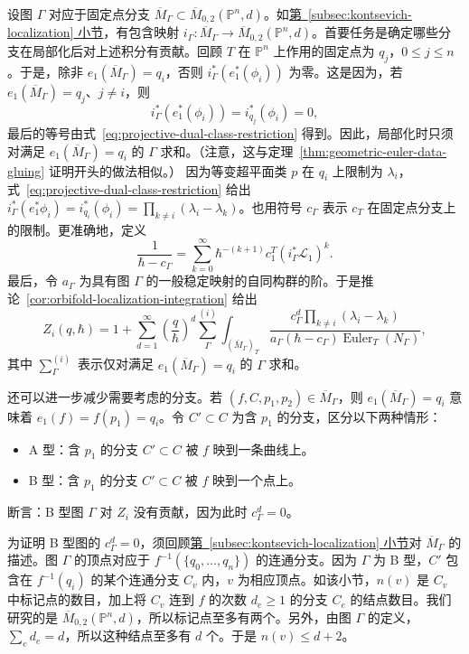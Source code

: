 设图 $\Gamma$ 对应于固定点分支 $\overline M_\Gamma\subset\overline M_{0,2}(\mathbb P^n,d)$。如\hyperref[subsec:kontsevich-localization]{第~\ref*{subsec:kontsevich-localization} 小节}，有包含映射 $i_\Gamma:\overline M_\Gamma\to\overline M_{0,2}(\mathbb P^n,d)$。首要任务是确定哪些分支在局部化后对上述积分有贡献。回顾 $T$ 在 $\mathbb P^n$ 上作用的固定点为 $q_j$，$0\le j\le n$。于是，除非 $e_1(\overline M_\Gamma)=q_i$，否则 $i_\Gamma^*(e_1^*(\phi_i))$ 为零。这是因为，若 $e_1(\overline M_\Gamma)=q_j$、$j\ne i$，则
\[
i_\Gamma^*(e_1^*(\phi_i))=i_{q_j}^*(\phi_i)=0,
\]
最后的等号由式~\eqref{eq:projective-dual-class-restriction} 得到。因此，局部化时只须对满足 $e_1(\overline M_\Gamma)=q_i$ 的 $\Gamma$ 求和。（注意，这与定理~\ref{thm:geometric-euler-data-gluing} 证明开头的做法相似。）
因为等变超平面类 $p$ 在 $q_i$ 上限制为 $\lambda_i$，式~\eqref{eq:projective-dual-class-restriction} 给出 $i_\Gamma^*(e_1^*\phi_i)=i_{q_i}^*(\phi_i)=\prod_{k\ne i}(\lambda_i-\lambda_k)$。也用符号 $c_\Gamma$ 表示 $c_T$ 在固定点分支上的限制。更准确地，定义
\[
\frac1{\hbar-c_\Gamma}=\sum_{k=0}^{\infty}\hbar^{-(k+1)}c_1^T(i_\Gamma^*\mathcal L_1)^k.
\]
最后，令 $a_\Gamma$ 为具有图 $\Gamma$ 的一般稳定映射的自同构群的阶。于是推论~\ref{cor:orbifold-localization-integration} 给出
\begin{equation}\label{eq:projective-space-j-localization}
Z_i(q,\hbar)=1+\sum_{d=1}^{\infty}\left(\frac q\hbar\right)^d\sum_\Gamma^{(i)}
\int_{(\overline M_\Gamma)_T}
\frac{c_\Gamma^d\prod_{k\ne i}(\lambda_i-\lambda_k)}{a_\Gamma(\hbar-c_\Gamma)\operatorname{Euler}_T(N_\Gamma)},
\end{equation}
其中 $\sum_\Gamma^{(i)}$ 表示仅对满足 $e_1(\overline M_\Gamma)=q_i$ 的 $\Gamma$ 求和。

还可以进一步减少需要考虑的分支。若 $(f,C,p_1,p_2)\in\overline M_\Gamma$，则 $e_1(\overline M_\Gamma)=q_i$ 意味着 $e_1(f)=f(p_1)=q_i$。令 $C'\subset C$ 为含 $p_1$ 的分支，区分以下两种情形：
\begin{itemize}
\item A 型：含 $p_1$ 的分支 $C'\subset C$ 被 $f$ 映到一条曲线上。
\item B 型：含 $p_1$ 的分支 $C'\subset C$ 被 $f$ 映到一个点上。
\end{itemize}
断言：B 型图 $\Gamma$ 对 $Z_i$ 没有贡献，因为此时 $c_\Gamma^d=0$。

为证明 B 型图的 $c_\Gamma^d=0$，须回顾\hyperref[subsec:kontsevich-localization]{第~\ref*{subsec:kontsevich-localization} 小节}对 $\overline M_\Gamma$ 的描述。图 $\Gamma$ 的顶点对应于 $f^{-1}(\{q_0,\ldots,q_n\})$ 的连通分支。因为 $\Gamma$ 为 B 型，$C'$ 包含在 $f^{-1}(q_i)$ 的某个连通分支 $C_v$ 内，$v$ 为相应顶点。如该小节，$n(v)$ 是 $C_v$ 中标记点的数目，加上将 $C_v$ 连到 $f$ 的次数 $d_e\ge1$ 的分支 $C_e$ 的结点数目。我们研究的是 $\overline M_{0,2}(\mathbb P^n,d)$，所以标记点至多有两个。另外，由图 $\Gamma$ 的定义，$\sum_ed_e=d$，所以这种结点至多有 $d$ 个。于是 $n(v)\le d+2$。

